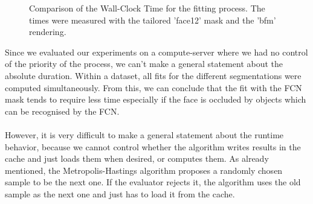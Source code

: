 \begin{figure}[H]
	\begin{center}
	\end{center}
	\caption{Comparison of the Wall-Clock Time for the fitting process. The times were measured with the tailored 'face12' mask and the 'bfm' rendering.}
	\label{fig:chap3:times}
\end{figure}

Since we evaluated our experiments on a compute-server where we had no control of the priority of the process, we can't make a general statement about the absolute duration. Within a dataset, all fits for the different segmentations were computed simultaneously. From this, we can conclude that the fit with the FCN mask tends to require less time especially if the face is occluded by objects which can be recognised by the FCN.\\
\\
However, it is very difficult to make a general statement about the runtime behavior, because we cannot control whether the algorithm writes results in the cache and just loads them when desired, or computes them. As already mentioned, the Metropolis-Hastings algorithm proposes a randomly chosen sample to be the next one. If the evaluator rejects it, the algorithm uses the old sample as the next one and just has to load it from the cache.  
